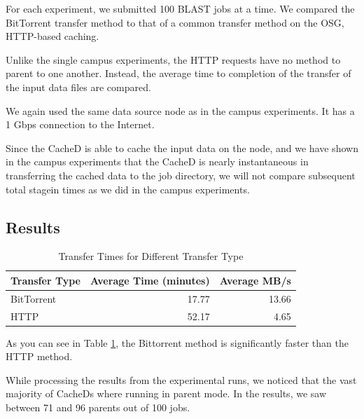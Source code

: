 For each experiment, we submitted 100 BLAST jobs at a time.  We compared the BitTorrent transfer method to that of a common transfer method on the OSG, HTTP-based caching. 




Unlike the single campus experiments, the HTTP requests have no method to parent to one another. Instead, the average time to completion of the transfer of the input data files are compared.

We again used the same data source node as in the campus experiments.  It has a 1 Gbps connection to the Internet.

Since the CacheD is able to cache the input data on the node, and we have shown in the campus experiments that the CacheD is nearly instantaneous in transferring the cached data to the job directory, we will not compare subsequent total stagein times as we did in the campus experiments.

\subsection{Results}



\begin{table}[h!t]
	\centering
	\bgroup
	\def\arraystretch{1.5}
\begin{tabular}{|l|r|r|}
\hline
\textbf{Transfer Type} & \textbf{Average Time (minutes)} & \textbf{Average MB/s} \\ \hline
BitTorrent & 17.77 & 13.66 \\ \hline
HTTP & 52.17 & 4.65 \\ \hline
\end{tabular}
\egroup
\caption{Transfer Times for Different Transfer Type}
\label{tbl:osgtransferstats}
\end{table}

As you can see in Table \ref{tbl:osgtransferstats}, the Bittorrent method is significantly faster than the HTTP method.  

While processing the results from the experimental runs, we noticed that the vast majority of CacheDs where running in parent mode.  In the results, we saw between 71 and 96 parents out of 100 jobs.

